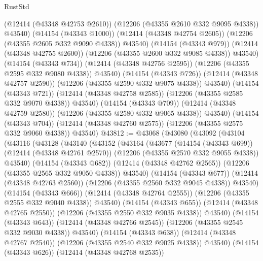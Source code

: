 \begin{lexlean}{RustStd}
\begin{coremodule}
{\begin{coremodule}
{{{{{{{{{{{{{{{{{{{{{{{{{{{{{{{{{{{{{{{{{{{{{{{{{{                    (@12414 (@43348 @42753 @2610))
                    (@12206 (@43355 @2610 @332 @9095 @4338))
                    @43540)
                  (@14154 (@43343 @1000))
                  (@12414 (@43348 @42754 @2605))
                  (@12206 (@43355 @2605 @332 @9090 @4338))
                  @43540)
                (@14154 (@43343 @979))
                (@12414 (@43348 @42755 @2600))
                (@12206 (@43355 @2600 @332 @9085 @4338))
                @43540)
              (@14154 (@43343 @734))
              (@12414 (@43348 @42756 @2595))
              (@12206 (@43355 @2595 @332 @9080 @4338))
              @43540)
            (@14154 (@43343 @726))
            (@12414 (@43348 @42757 @2590))
            (@12206 (@43355 @2590 @332 @9075 @4338))
            @43540)
          (@14154 (@43343 @721))
          (@12414 (@43348 @42758 @2585))
          (@12206 (@43355 @2585 @332 @9070 @4338))
          @43540)
        (@14154 (@43343 @709))
        (@12414 (@43348 @42759 @2580))
        (@12206 (@43355 @2580 @332 @9065 @4338))
        @43540)
      (@14154 (@43343 @704))
      (@12414 (@43348 @42760 @2575))
      (@12206 (@43355 @2575 @332 @9060 @4338))
      @43540)
@43812 := @43068
    (@43080
      (@43092
        (@43104
          (@43116
            (@43128
              (@43140
                (@43152
                  (@43164
                    (@43677
                      (@14154 (@43343 @699))
                      (@12414 (@43348 @42761 @2570))
                      (@12206 (@43355 @2570 @332 @9055 @4338))
                      @43540)
                    (@14154 (@43343 @682))
                    (@12414 (@43348 @42762 @2565))
                    (@12206 (@43355 @2565 @332 @9050 @4338))
                    @43540)
                  (@14154 (@43343 @677))
                  (@12414 (@43348 @42763 @2560))
                  (@12206 (@43355 @2560 @332 @9045 @4338))
                  @43540)
                (@14154 (@43343 @666))
                (@12414 (@43348 @42764 @2555))
                (@12206 (@43355 @2555 @332 @9040 @4338))
                @43540)
              (@14154 (@43343 @655))
              (@12414 (@43348 @42765 @2550))
              (@12206 (@43355 @2550 @332 @9035 @4338))
              @43540)
            (@14154 (@43343 @643))
            (@12414 (@43348 @42766 @2545))
            (@12206 (@43355 @2545 @332 @9030 @4338))
            @43540)
          (@14154 (@43343 @638))
          (@12414 (@43348 @42767 @2540))
          (@12206 (@43355 @2540 @332 @9025 @4338))
          @43540)
        (@14154 (@43343 @626))
        (@12414 (@43348 @42768 @2535))
}}}}}}}}}}}}}}}}}}}}}}}}}}}}}}}}}}}}}}}}}}}}}}}}}}
\end{coremodule}}
\end{coremodule}
\end{lexlean}
